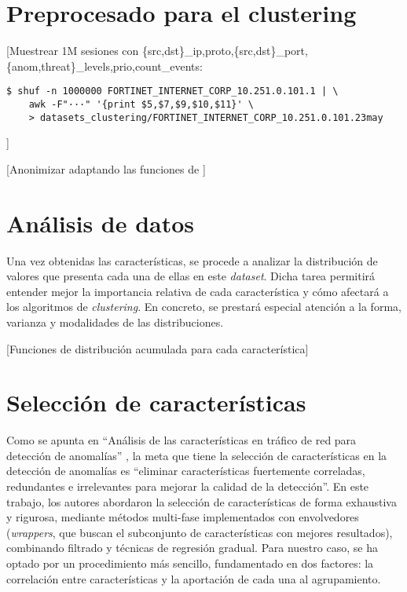 \section{Preprocesado para el clustering}\label{sec:preprocesado}

[Muestrear 1M sesiones con \{src,dst\}\_ip,proto,\{src,dst\}\_port,\{anom,threat\}\_levels,prio,count\_events:
\begin{verbatim}
$ shuf -n 1000000 FORTINET_INTERNET_CORP_10.251.0.101.1 | \
    awk -F"···" '{print $5,$7,$9,$10,$11}' \
    > datasets_clustering/FORTINET_INTERNET_CORP_10.251.0.101.23may
\end{verbatim}
]

[Anonimizar adaptando las funciones de \cite{Labayen_2020}]

\section{Análisis de datos}\label{sec:analisisdedatos}

Una vez obtenidas las características, se procede a analizar la distribución de valores que presenta cada una de ellas en este \emph{dataset}.
Dicha tarea permitirá entender mejor la importancia relativa de cada característica y cómo afectará a los algoritmos de \emph{clustering}.
En concreto, se prestará especial atención a la forma, varianza y modalidades de las distribuciones.

[Funciones de distribución acumulada para cada característica]

\section{Selección de características}\label{sec:selecciondecaracteristicas}

Como se apunta en ``Análisis de las características en tráfico de red para detección de anomalías'' \cite{Iglesias_2015},
la meta que tiene la selección de características en la detección de anomalías es
``eliminar características fuertemente correladas, redundantes e irrelevantes para mejorar la calidad de la detección''.
En este trabajo, los autores abordaron la selección de características de forma exhaustiva y rigurosa,
mediante métodos multi-fase implementados con envolvedores (\emph{wrappers}, que buscan el subconjunto de características con mejores resultados),
combinando filtrado y técnicas de regresión gradual.
Para nuestro caso, se ha optado por un procedimiento más sencillo, fundamentado en dos factores: la correlación entre características y la aportación de cada una al agrupamiento.

